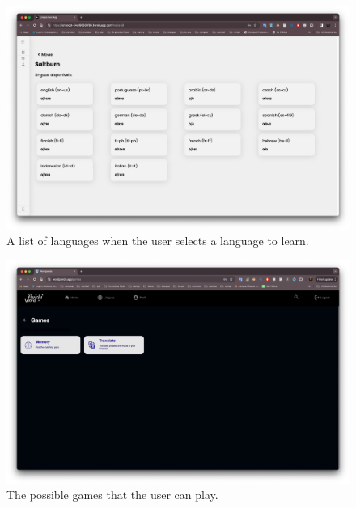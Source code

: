 \documentclass[12pt]{article}
\begin{document}
    \begin{figure}
      \centering
      \caption{
      A list of languages when the user selects a language to learn.
      }
      \label{fig:site4}
      \includegraphics[width=1\textwidth]{assets/25.png}
    \end{figure}

    \begin{figure}
      \centering
      \caption{
      The possible games that the user can play.
      }
      \label{fig:site5}
      \includegraphics[width=1\textwidth]{assets/5.png}
    \end{figure}
\end{document}
